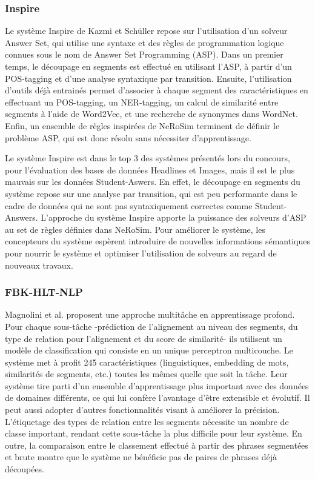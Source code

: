 \documentclass[a4paper, twoside, 11pt]{article}
\begin{document}
        \subsubsection{Inspire}

Le système Inspire de Kazmi et Schüller \cite{kazmi} repose sur l'utilisation d'un solveur Answer Set, qui utilise une syntaxe et des règles de programmation logique connues sous le nom de Answer Set Programming (ASP). Dans un premier temps, le découpage en segments est effectué en utilisant l'ASP, à partir d'un POS-tagging et d'une analyse syntaxique par transition. Ensuite, l'utilisation d'outils déjà entrainés permet d'associer à chaque segment des caractéristiques en effectuant un POS-tagging, un NER-tagging, un calcul de similarité entre segments à l'aide de Word2Vec, et une recherche de synonymes dans WordNet. Enfin, un ensemble de règles inspirées de NeRoSim terminent de définir le problème ASP, qui est donc résolu sans nécessiter d'apprentissage.

Le système Inspire est dans le top 3 des systèmes présentés lors du concours, pour l'évaluation des bases de données Headlines et Images, mais il est le plus mauvais sur les données Student-Aswers. En effet, le découpage en segments du système repose sur une analyse par transition, qui est peu performante dans le cadre de données qui ne sont pas syntaxiquement correctes comme Student-Answers. L'approche du système Inspire apporte la puissance des solveurs d'ASP au set de règles définies dans NeRoSim. Pour améliorer le système, les concepteurs du système espèrent introduire de nouvelles informations sémantiques pour nourrir le système et optimiser l'utilisation de solveurs au regard de nouveaux travaux.

        \subsubsection{FBK-HLT-NLP}

Magnolini et al. \cite{magnolini} proposent une approche multitâche en apprentissage profond. Pour chaque sous-tâche -prédiction de l’alignement au niveau des segments, du type de relation pour l’alignement et du score de similarité- ils utilisent un modèle de classification qui consiste en un unique perceptron multicouche. Le système met à profit 245 caractéristiques (linguistiques, embedding de mots, similarités de segments, etc.) toutes les mêmes quelle que soit la tâche.
Leur système tire parti d'un ensemble d'apprentissage plus important avec des données de domaines différents, ce qui lui confère l’avantage d’être extensible et évolutif. Il peut aussi adopter d’autres fonctionnalités visant à améliorer la précision.
L'étiquetage des types de relation entre les segments nécessite un nombre de classe important, rendant cette sous-tâche la plus difficile pour leur système.
En outre, la comparaison entre le classement effectué à partir des phrases segmentées et brute montre que le système ne bénéficie pas de paires de phrases déjà découpées.
\end{document}
